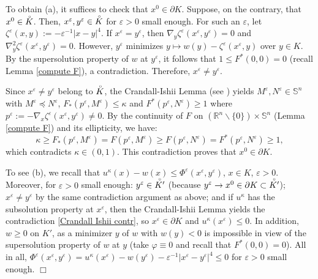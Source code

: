 \documentclass[11pt]{amsart}
\numberwithin{equation}{section}
\newcommand{\ep}{\hfill $\Box$}
\begin{document}
\medskip

To obtain (a), it suffices to check that $x^0\in\partial K$. Suppose, on the contrary, that $x^0\in \accentset{\circ}{K}$. Then, $x^\varepsilon,y^\varepsilon\in\accentset{\circ}{K}$ for $\varepsilon>0$ small enough. For such an $\varepsilon$, let $\zeta^\varepsilon(x,y) := -\varepsilon^{-1}|x-y|^4$. If $x^\varepsilon=y^\varepsilon$, then $\nabla_y \zeta^\varepsilon(x^\varepsilon, y^\varepsilon) = 0$ and $\nabla^2_y \zeta^\varepsilon(x^\varepsilon, y^\varepsilon) = 0$. However, $y^\varepsilon$ minimizes  $y\mapsto w(y) - \zeta^\varepsilon(x^\varepsilon, y)$ over $y \in K$. By the supersolution property of $w$ at $y^\varepsilon$, it follows that $1\le F^*(0,0)=0$ (recall Lemma \ref{compute F}), a contradiction. Therefore, $x^\varepsilon \neq y^\varepsilon$.
	
\medskip
	
Since $x^\varepsilon \neq y^\varepsilon$ belong to $\accentset{\circ}{K}$, the Crandall-Ishii Lemma (see \cite{CraIsh}) yields $M^\varepsilon,N^\varepsilon\in\mathbb{S}^n$ with $M^\varepsilon \preceq N^\varepsilon$, $F_*(p^\varepsilon, M^\varepsilon) \le \kappa$ and $F^*(p^\varepsilon, N^\varepsilon) \geq 1$ where $p^\varepsilon := -\nabla_x \zeta^\varepsilon(x^\varepsilon, y^\varepsilon)\neq 0$. By the continuity of $F$ on $({\mathbb R}^n\backslash\{0\})\times\mathbb{S}^n$ (Lemma \ref{compute F}) and its ellipticity, we have:
\begin{equation}\label{Crandall Ishii contr}
\kappa \ge F_*(p^\varepsilon, M^\varepsilon) = F(p^\varepsilon, M^\varepsilon) \ge F(p^\varepsilon, N^\varepsilon) = F^*(p^\varepsilon, N^\varepsilon) \geq 1,
\end{equation}
which contradicts $\kappa\in(0,1)$. This contradiction proves that $x^0 \in \partial K$.
	
\medskip
	
To see (b), we recall that $u^\kappa(x)-w(x)\le\Phi^\varepsilon(x^\varepsilon,y^\varepsilon)$, $x\in K$, $\varepsilon>0$. Moreover, for $\varepsilon>0$ small enough: $y^\varepsilon\in\accentset{\circ}{K'}$ (because $y^\varepsilon\to x^0\in\partial K\subset\accentset{\circ}{K'}$); $x^\varepsilon\neq y^\varepsilon$ by the same contradiction argument as above; and if $u^\kappa$ has the subsolution property at $x^\varepsilon$, then the Crandall-Ishii Lemma yields the contradiction \eqref{Crandall Ishii contr}, so $x^\varepsilon\in\partial K$ and $u^\kappa(x^\varepsilon)\le 0$. In addition, $w\ge0$ on $K'$, as a minimizer $y$ of $w$ with $w(y)<0$ is impossible in view of the supersolution property of $w$ at $y$ (take $\varphi\equiv0$ and recall that $F^*(0,0)=0$). All in all, $\Phi^\varepsilon(x^\varepsilon,y^\varepsilon)=u^\kappa(x^\varepsilon) - w(y^\varepsilon) - \varepsilon^{-1} |x^\varepsilon-y^\varepsilon|^4\le 0$ for $\varepsilon>0$ small enough. \ep
\end{document}
